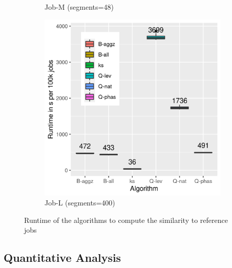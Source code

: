 \documentclass{jhps}
\begin{document}
\begin{figure}
\begin{subfigure}{0.31\textwidth}
  \caption{Job-M (segments=48)}\label{fig:perf-job-M}
  \end{subfigure}
  \begin{subfigure}{0.31\textwidth}
  \centering
  \includegraphics[width=\textwidth]{progress_7488914-out-boxplot}
  \caption{Job-L (segments=400)}\label{fig:perf-job-L}
  \end{subfigure}

  \caption{Runtime of the algorithms to compute the similarity to reference jobs}%
  \label{fig:performance}
\end{figure}


\subsection{Quantitative Analysis}
\end{document}
